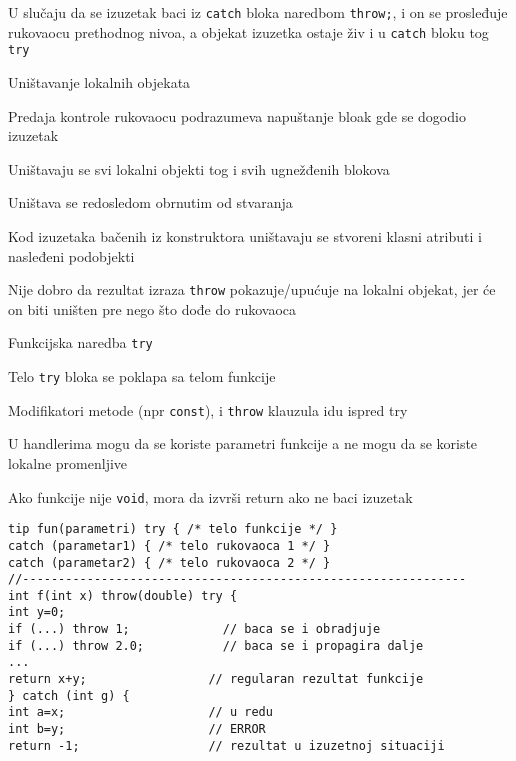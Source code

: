 \documentclass{article}
\newenvironment{xitemize}{%
    
    \itemize
    \larger
}{%
    \enditemize
}
\let\olditemize\itemize
\let\endolditemize\enditemize
\renewenvironment{itemize}{%
    \smaller
    \olditemize
}{%
    \endolditemize
}
\providecommand{\inlinecode}[1]{\texttt{#1}}
\begin{document}
\begin{xitemize}
\begin{itemize}
    \item U slučaju da se izuzetak baci iz \inlinecode{catch} bloka naredbom \inlinecode{throw;}, i on se prosleđuje rukovaocu prethodnog nivoa, a objekat izuzetka ostaje živ i u \inlinecode{catch} bloku tog \inlinecode{try}
\end{itemize}
\item Uništavanje lokalnih objekata
\begin{itemize}
    \item Predaja kontrole rukovaocu podrazumeva napuštanje bloak gde se dogodio izuzetak
    \item Uništavaju se svi lokalni objekti tog i svih ugnežđenih blokova
    \item Uništava se redosledom obrnutim od stvaranja
    \item Kod izuzetaka bačenih iz konstruktora uništavaju se stvoreni klasni atributi i nasleđeni podobjekti
    \item Nije dobro da rezultat izraza \inlinecode{throw} pokazuje/upućuje na lokalni objekat, jer će on biti uništen pre nego što dođe do rukovaoca
\end{itemize}
\item Funkcijska naredba \inlinecode{try}
\begin{itemize}
    \item Telo \inlinecode{try} bloka se poklapa sa telom funkcije
    \item Modifikatori metode (npr \inlinecode{const}), i \inlinecode{throw} klauzula idu ispred try
    \item U handlerima mogu da se koriste parametri funkcije a ne mogu da se koriste lokalne promenljive
    \item Ako funkcije nije \inlinecode{void}, mora da izvrši return ako ne baci izuzetak
    \begin{lstlisting}
tip fun(parametri) try { /* telo funkcije */ }
catch (parametar1) { /* telo rukovaoca 1 */ }
catch (parametar2) { /* telo rukovaoca 2 */ }
//--------------------------------------------------------------
int f(int x) throw(double) try {
int y=0;
if (...) throw 1;             // baca se i obradjuje
if (...) throw 2.0;           // baca se i propagira dalje
...
return x+y;                 // regularan rezultat funkcije
} catch (int g) {
int a=x;                    // u redu
int b=y;                    // ERROR
return -1;                  // rezultat u izuzetnoj situaciji
            

\end{lstlisting}
\end{itemize}
\end{xitemize}
\end{document}
